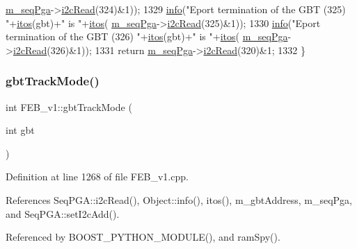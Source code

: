 \begin{DoxyCode}
      \hyperlink{classFEB__v1_a6c7804ac86796f233a8393043adf2e77}{m\_seqPga}->\hyperlink{classSeqPGA_a7cd344df2be99f3a02b487f80e87b27e}{i2cRead}(324)&1));
1329   \hyperlink{classObject_a644fd329ea4cb85f54fa6846484b84a8}{info}(\textcolor{stringliteral}{"Eport termination of the GBT (325) "}+\hyperlink{Tools_8h_af330027dbdafb9a30768b3613c553e60}{itos}(gbt)+\textcolor{stringliteral}{" is "}+\hyperlink{Tools_8h_af330027dbdafb9a30768b3613c553e60}{itos}(
      \hyperlink{classFEB__v1_a6c7804ac86796f233a8393043adf2e77}{m\_seqPga}->\hyperlink{classSeqPGA_a7cd344df2be99f3a02b487f80e87b27e}{i2cRead}(325)&1));
1330   \hyperlink{classObject_a644fd329ea4cb85f54fa6846484b84a8}{info}(\textcolor{stringliteral}{"Eport termination of the GBT (326) "}+\hyperlink{Tools_8h_af330027dbdafb9a30768b3613c553e60}{itos}(gbt)+\textcolor{stringliteral}{" is "}+\hyperlink{Tools_8h_af330027dbdafb9a30768b3613c553e60}{itos}(
      \hyperlink{classFEB__v1_a6c7804ac86796f233a8393043adf2e77}{m\_seqPga}->\hyperlink{classSeqPGA_a7cd344df2be99f3a02b487f80e87b27e}{i2cRead}(326)&1));
1331   \textcolor{keywordflow}{return} \hyperlink{classFEB__v1_a6c7804ac86796f233a8393043adf2e77}{m\_seqPga}->\hyperlink{classSeqPGA_a7cd344df2be99f3a02b487f80e87b27e}{i2cRead}(320)&1;
1332 \}
\end{DoxyCode}
\mbox{\label{classFEB__v1_a25eeb132e9058cd421a085878fba9204}} 
\subsubsection{\texorpdfstring{gbt\+Track\+Mode()}{gbtTrackMode()}}
{\footnotesize\ttfamily int F\+E\+B\+\_\+v1\+::gbt\+Track\+Mode (\begin{DoxyParamCaption}\item[{int}]{gbt }\end{DoxyParamCaption})}



Definition at line 1268 of file F\+E\+B\+\_\+v1.\+cpp.



References Seq\+P\+G\+A\+::i2c\+Read(), Object\+::info(), itos(), m\+\_\+gbt\+Address, m\+\_\+seq\+Pga, and Seq\+P\+G\+A\+::set\+I2c\+Add().



Referenced by B\+O\+O\+S\+T\+\_\+\+P\+Y\+T\+H\+O\+N\+\_\+\+M\+O\+D\+U\+L\+E(), and ram\+Spy().


